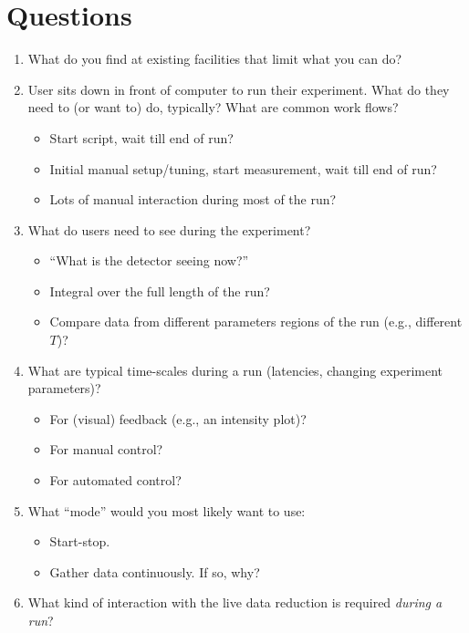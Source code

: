 \documentclass[a4paper,english,numbers=noenddot,bibliography=totoc,chapterprefix=on,DIV=12]{scrartcl}
\begin{document}
\section{Questions}

\begin{enumerate}
  \item What do you find at existing facilities that limit what you can do?
  \item User sits down in front of computer to run their experiment.
    What do they need to (or want to) do, typically?
    What are common work flows?
    \begin{itemize}
      \item Start script, wait till end of run?
      \item Initial manual setup/tuning, start measurement, wait till end of run?
      \item Lots of manual interaction during most of the run?
    \end{itemize}
  \item What do users need to see during the experiment?
    \begin{itemize}
      \item ``What is the detector seeing now?''
      \item Integral over the full length of the run?
      \item Compare data from different parameters regions of the run (e.g., different $T$)?
    \end{itemize}
  \item What are typical time-scales during a run (latencies, changing experiment parameters)?
    \begin{itemize}
      \item For (visual) feedback (e.g., an intensity plot)?
      \item For manual control?
      \item For automated control?
    \end{itemize}
  \item What ``mode'' would you most likely want to use:
    \begin{itemize}
      \item Start-stop.
      \item Gather data continuously.
        If so, why?
    \end{itemize}
  \item What kind of interaction with the live data reduction is required \emph{during a run}?
    \begin{itemize}

\end{itemize}
\end{enumerate}
\end{document}
